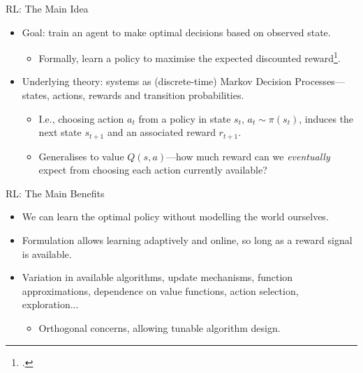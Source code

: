 \documentclass[aspectratio=169,xcolor={dvipsnames}
,hide notes
]{beamer}
\begin{document}
\begin{frame}{RL: The Main Idea\texttrademark}
	\begin{itemize}
		\item Goal: train an agent to make optimal decisions based on observed state.
		\begin{itemize}
			\item Formally, learn a \alert{policy} to maximise the \alert{expected discounted reward}\footcite{RL2E}.
		\end{itemize}
	
		\item Underlying theory: systems as (discrete-time) \alert{Markov Decision Processes}---states, actions, rewards and transition probabilities.
		\begin{itemize}
			\item I.e., choosing action $a_t$ from a policy in state $s_t$, $a_t \sim \pi(s_t)$, induces the next state $s_{t+1}$ and an associated reward $r_{t+1}$.
			\item Generalises to \alert{value} $Q(s,a)$---how much reward can we \emph{eventually} expect from choosing each action currently available?
		\end{itemize}
	
	\end{itemize}
\end{frame}

\begin{frame}{RL: The Main Benefits\texttrademark}
\begin{itemize}
	\item We can learn the optimal policy \alert{without modelling the world ourselves}.
	\item Formulation allows learning adaptively and online, so long as a reward signal is available.
	\item Variation in available algorithms, update mechanisms, function approximations, dependence on value functions, action selection, exploration...
	\begin{itemize}
		\item Orthogonal concerns, allowing tunable algorithm design.
	\end{itemize}
\end{itemize}
\end{frame}
\end{document}
